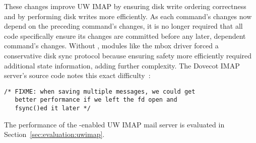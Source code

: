 These changes improve UW IMAP by
%
ensuring disk write ordering correctness
%
and by performing disk writes more efficiently.
%
As each command's changes now depend on the preceding command's
changes, it is no longer required that all code
specifically ensure its changes are committed before any later, dependent
command's changes. Without \patchgroups, modules like the mbox driver
forced a conservative disk sync protocol because ensuring safety more
efficiently required additional state information, adding further
complexity. The Dovecot IMAP server's source code notes this exact
difficulty~\cite[maildir-save.c]{dovecot}:

\vspace{-0.5\baselineskip}
\begin{scriptsize}
\begin{verbatim}
/* FIXME: when saving multiple messages, we could get
   better performance if we left the fd open and
   fsync()ed it later */
\end{verbatim}
\end{scriptsize}
\vspace{-0.5\baselineskip}

The performance of the \patchgroup{}-enabled UW IMAP mail server is
evaluated in Section~\ref{sec:evaluation:uwimap}.
